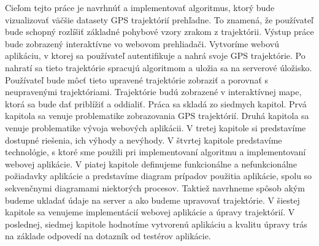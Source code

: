 Cieľom tejto práce je navrhnúť a implementovať algoritmus, ktorý bude vizualizovať väčšie datasety GPS trajektórií prehľadne. To znamená, že používateľ bude schopný rozlíšiť základné pohybové vzory zrakom z trajektórii. Výstup práce bude zobrazený interaktívne vo webovom prehliadači. Vytvoríme webovú aplikáciu, v ktorej sa používateľ autentifikuje a nahrá svoje GPS trajektórie.  Po nahratí sa tieto trajektórie spracujú algoritmom a uložia sa na serverové úložisko. Používateľ bude môcť tieto upravené trajektórie zobraziť a porovnať s neupravenými trajektóriami. Trajektórie budú zobrazené v interaktívnej mape, ktorá sa bude dať priblížiť a oddialiť. Práca sa skladá zo siedmych kapitol. Prvá kapitola sa venuje problematike zobrazovania GPS trajektórií. Druhá kapitola sa venuje problematike vývoja webových aplikácii. V tretej kapitole si predstavíme dostupné riešenia, ich výhody a nevýhody. V štvrtej kapitole predstavíme technológie, s ktoré sme použili pri implementovaní algoritmu a implementovaní webovej aplikácie. V piatej kapitole definujeme funkcionálne a nefunkcionálne požiadavky aplikácie a predstavíme diagram prípadov použitia aplikácie, spolu so sekvenčnymi diagramami niektorých procesov. Taktiež navrhneme spôsob akým budeme ukladať údaje na server a ako budeme upravovať trajektórie. V šiestej kapitole sa venujeme implementácií webovej aplikácie a úpravy trajektórií. V poslednej, siedmej kapitole hodnotíme vytvorenú aplikáciu a kvalitu úpravy trás na základe odpovedí na dotazník od testérov aplikácie.